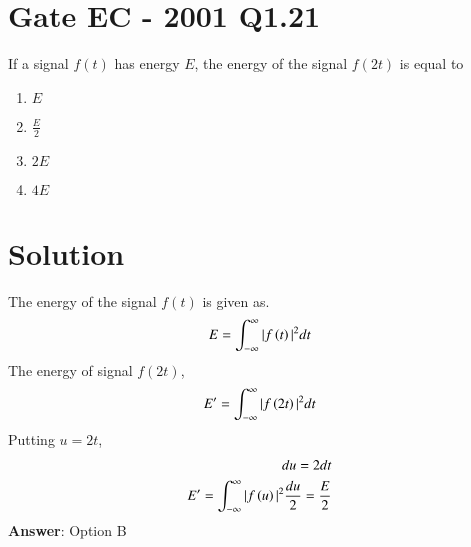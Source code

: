 \documentclass[journal,12pt,twocolumn]{IEEEtran}
\begin{document}
\section*{Gate EC - 2001 Q1.21}
If a signal $f(t)$ has energy $E$, the energy of the signal $f(2t)$ is equal to 
\begin{enumerate}[label=\Alph*)]
    \item $E$
    \item $\frac{E}{2}$
    \item $2E$
    \item $4E$
\end{enumerate}
\section*{Solution}
The energy of the signal $f(t)$ is given as.
\begin{align}
    E = \int_{-\infty}^{\infty} |f\left(t\right)|^2 dt
\end{align}
The energy of signal $f(2t)$,
\begin{align}
    E' = \int_{-\infty}^{\infty} |f\left(2t\right)|^2 dt
\end{align}
Putting $u = 2t$,
\begin{align}
    du = 2dt\\
    E' = \int_{-\infty}^{\infty} |f\left(u\right)|^2 \frac{du}{2} = \frac{E}{2}
\end{align}
\textbf{Answer}: Option B
\end{document}
